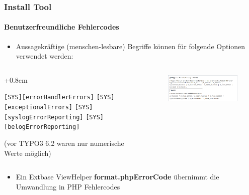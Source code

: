 
\begin{frame}[fragile]
	\frametitle{Install Tool}
	\framesubtitle{Benutzerfreundliche Fehlercodes}

	\begin{itemize}
		\item Aussagekräftige (menschen-lesbare) Begriffe können für folgende Optionen verwendet werden:
	\end{itemize}

	\begin{columns}[T]
		\begin{column}{.4\textwidth}
			\advance\leftskip+0.8cm

			\smaller
				\texttt{[SYS][errorHandlerErrors]}\newline
				\texttt{[SYS][exceptionalErrors]}\newline
				\texttt{[SYS][syslogErrorReporting]}\newline
				\texttt{[SYS][belogErrorReporting]}\newline
			\normalsize

			\small(vor TYPO3 6.2 waren nur numerische Werte möglich)\normalsize

		\end{column}
		\begin{column}{.6\textwidth}

			\begin{figure}\vspace*{-0.4cm}
				\includegraphics[width=0.9\linewidth]{Images/InstallTool/HumanFriendlyErrorCodes.png}
			\end{figure}

		\end{column}
	\end{columns}

	\vspace{0.2cm}

	\begin{itemize}
		\item Ein Extbase ViewHelper \textbf{format.phpErrorCode} übernimmt die Umwandlung in PHP Fehlercodes
	\end{itemize}

\end{frame}

